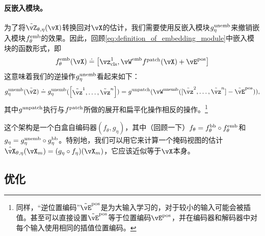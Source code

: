 \documentclass[../../book-main_zh.tex]{subfiles}
\begin{document}
\paragraph{反嵌入模块。} 为了将\(\tilde{\vZ}_{\theta, \eta}(\vX)\)转换回对\(\vX\)的估计，我们需要使用反嵌入模块\(g_{\eta}^{\mathrm{unemb}}\)来撤销嵌入模块\(f_{\theta}^{\mathrm{emb}}\)的效果。因此，回顾\eqref{eq:definition_of_embedding_module}中嵌入模块的函数形式，即
\begin{equation}
    f_{\theta}^{\emb}(\vX) \doteq \mat{\vz_{\cls}^{1}, \vW^{\emb}f^{\patch}(\vX) + \vE^{\pos}}
\end{equation}
这意味着我们的逆操作\(g_{\eta}^{\mathrm{unemb}}\)看起来如下：
\begin{equation}
    g_{\eta}^{\unemb}(\tilde{\vZ}) \doteq g_{\eta}^{\unemb}(\mat{\tilde{\vz}^{1}, \dots, \tilde{\vz}^{n}}) = g^{\unpatch}(\vW^{\unemb}([\tilde{\vz}^{2}, \dots, \tilde{\vz}^{n}] - \tilde{\vE}^{\pos})),
\end{equation}
其中\(g^{\mathrm{unpatch}}\)执行与\(f^{\mathrm{patch}}\)所做的展开和扁平化操作相反的操作。\footnote{同样，“逆位置编码”\(\tilde{\vE}^{\pos}\)是为大输入学习的，对于较小的输入可能会被插值。甚至可以直接设置\(\tilde{\vE}^{\pos}\)等于位置编码\(\vE^{\pos}\)，并在编码器和解码器中对每个输入使用相同的插值位置编码。}

这个架构是一个白盒自编码器\((f_{\theta}, g_{\eta})\)，其中（回顾一下）\(f_{\theta} = f_{\theta}^{\mathrm{bb}} \circ f_{\theta}^{\mathrm{emb}}\)和\(g_{\eta} = g_{\eta}^{\mathrm{unemb}} \circ g_{\eta}^{\mathrm{bb}}\)。特别地，我们可以用它来计算一个掩码视图的估计\(\hat{\vX}_{\theta, \eta}(\vX_{m}) = (g_{\eta} \circ f_{\eta})(\vX_{m})\)，它应该近似等于\(\vX\)本身。

\subsection{优化}\label{sub:image_completion_optimization}
\end{document}
